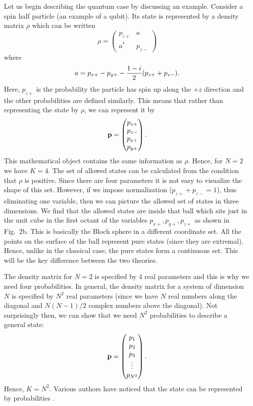 \documentclass[12pt]{article}
\begin{document}
Let us begin describing the quantum case by discussing an example.
Consider a spin half particle (an example of a qubit).  Its state is
represented by a density matrix $\rho$ which can be written
\begin{equation}
\rho= \left( \begin{matrix} p_{z+} & a \\ a^* & p_{z-} \end{matrix}
\right)
\end{equation}
where
\begin{equation}
a=p_{x+} - p_{y+} - {1-i\over 2}(p_{z+}+p_{z-}).
\end{equation}
Here, $p_{z+}$ is the probability the particle has
spin up along the $+z$ direction and the other probabilities are defined
similarly.  This means that rather than
representing the state by $\rho$, we can represent it by
\begin{equation}
{\bf p} = \left( \begin{matrix} p_{z+} \\ p_{z-} \\ p_{x+} \\ p_{y+}
\end{matrix} \right).
\end{equation}
This mathematical object contains the same information as $\rho$.
Hence, for $N=2$ we have $K=4$.  The set of allowed states can be
calculated from the condition that $\rho$ is positive.  Since there are
four parameters it is not easy to visualize the shape of this set.
However, if we impose normalization ($p_{z+}+p_{z-}=1$), thus eliminating
one variable, then we can picture the allowed set of states in three
dimensions.  We find that the allowed states are inside that ball which sits
just in the unit cube in the first octant of the variables
$p_{x+}, p_{y+}, p_{z+}$ as shown in Fig.~2b.  This is basically the
Bloch sphere in a different coordinate set.  All the points on the
surface of the ball represent pure states (since they are extremal).
Hence, unlike in the classical case, the pure states form a continuous
set.  This will be the key difference between the two theories.

The density matrix for $N=2$ is specified by 4 real parameters and this
is why we need four probabilities.  In general, the density matrix for a
system of dimension $N$ is specified by $N^2$ real parameters (since we have
$N$ real numbers along the diagonal and $N(N-1)/2$ complex numbers above
the diagonal).  Not surprisingly then, we can show that we
need $N^2$ probabilities to describe a general state:
\begin{equation}
  {\bf p} = \left(
  \begin{matrix} p_1 \\ p_2 \\ p_3 \\ \vdots \\ p_{N^2} \end{matrix}
  \right).
\end{equation}
Hence, $K=N^2$.  Various authors have noticed that the state can be
represented by probabilities \cite{wootters,prug,busch,stefan}.
\end{document}
